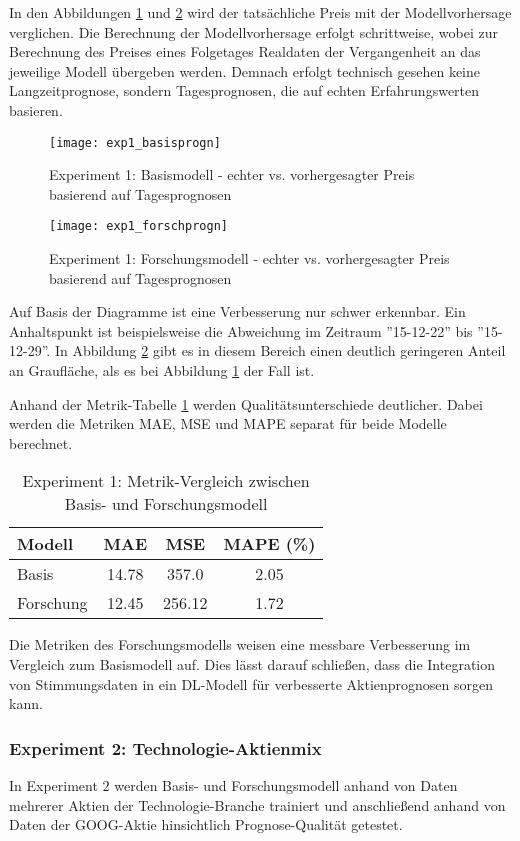 In den Abbildungen \ref{fig:exp1_basisprogn} und \ref{fig:exp1_forschprogn} wird der tatsächliche Preis mit der Modellvorhersage verglichen. Die Berechnung der Modellvorhersage erfolgt schrittweise, wobei zur Berechnung des Preises eines Folgetages Realdaten der Vergangenheit an das jeweilige Modell übergeben werden. Demnach erfolgt technisch gesehen keine Langzeitprognose, sondern Tagesprognosen, die auf echten Erfahrungswerten basieren.
\begin{figure}[H]
	\texttt{[image: exp1\_basisprogn]}
	\caption{Experiment 1: Basismodell - echter vs. vorhergesagter Preis basierend auf Tagesprognosen}
	\label{fig:exp1_basisprogn}
\end{figure}
\begin{figure}[H]
	\texttt{[image: exp1\_forschprogn]}
	\caption{Experiment 1: Forschungsmodell - echter vs. vorhergesagter Preis basierend auf Tagesprognosen}
	\label{fig:exp1_forschprogn}
\end{figure}
Auf Basis der Diagramme ist eine Verbesserung nur schwer erkennbar. Ein Anhaltspunkt ist beispielsweise die Abweichung im Zeitraum ''15-12-22'' bis ''15-12-29''. In Abbildung \ref{fig:exp1_forschprogn} gibt es in diesem Bereich einen deutlich geringeren Anteil an Graufläche, als es bei Abbildung \ref{fig:exp1_basisprogn} der Fall ist.

Anhand der Metrik-Tabelle \ref{tbl:exp1_model_metrics} werden Qualitätsunterschiede deutlicher. Dabei werden die Metriken \ac{MAE}, \ac{MSE} und \ac{MAPE} separat für beide Modelle berechnet.
\begin{table}[H]
	\centering
	\caption{Experiment 1: Metrik-Vergleich zwischen Basis- und Forschungsmodell}
	\label{tbl:exp1_model_metrics}
	\begin{tabular}{lccc}
		\hline
		\textbf{Modell} & \textbf{MAE} & \textbf{MSE} & \textbf{MAPE (\%)} \\
		\hline
		Basis & 14.78 & 357.0 & 2.05 \\
		Forschung & 12.45 & 256.12 & 1.72 \\
		\hline
	\end{tabular}
\end{table}
Die Metriken des Forschungsmodells weisen eine messbare Verbesserung im Vergleich zum Basismodell auf. Dies lässt darauf schließen, dass die Integration von Stimmungsdaten in ein \ac{DL}-Modell für verbesserte Aktienprognosen sorgen kann.

\subsubsection{Experiment 2: Technologie-Aktienmix}\label{sec:evaluierung_exp2}
In Experiment $2$ werden Basis- und Forschungsmodell anhand von Daten mehrerer Aktien der Technologie-Branche trainiert und anschließend anhand von Daten der GOOG-Aktie hinsichtlich Prognose-Qualität getestet.

